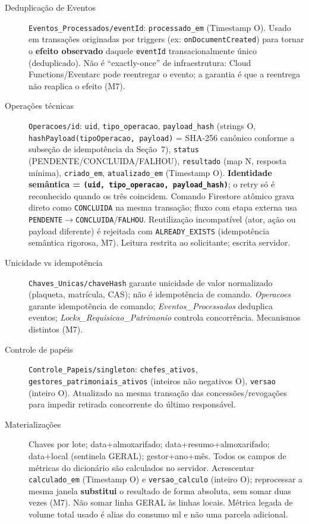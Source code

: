 \begin{description}
\item[Deduplicação de Eventos] \texttt{Eventos\_Processados/eventId}: \texttt{processado\_em} (Timestamp O). Usado em transações originadas por triggers (ex: \texttt{onDocumentCreated}) para tornar o \textbf{efeito observado} daquele \texttt{eventId} transacionalmente único (deduplicado). Não é ``exactly-once'' de infraestrutura: Cloud Functions/Eventarc pode reentregar o evento; a garantia é que a reentrega não reaplica o efeito (M7).
\item[Operações técnicas] \texttt{Operacoes/id}: \texttt{uid}, \texttt{tipo\_operacao}, \texttt{payload\_hash} (strings O, \texttt{hashPayload(tipoOperacao, payload)} = SHA-256 canônico conforme a subseção de idempotência da Seção~7), \texttt{status} (PENDENTE/CONCLUIDA/FALHOU), \texttt{resultado} (map N, resposta mínima), \texttt{criado\_em}, \texttt{atualizado\_em} (Timestamp O). \textbf{Identidade semântica = \texttt{(uid, tipo\_operacao, payload\_hash)}}; o retry só é reconhecido quando os três coincidem. Comando Firestore atômico grava direto como \texttt{CONCLUIDA} na mesma transação; fluxo com etapa externa usa \texttt{PENDENTE}$\rightarrow$\texttt{CONCLUIDA}/\texttt{FALHOU}. Reutilização incompatível (ator, ação ou payload diferente) é rejeitada com \texttt{ALREADY\_EXISTS} (idempotência semântica rigorosa, M7). Leitura restrita ao solicitante; escrita servidor.
\item[Unicidade vs idempotência] \texttt{Chaves\_Unicas/chaveHash} garante unicidade de valor normalizado (plaqueta, matrícula, CAS); não é idempotência de comando. \textit{Operacoes} garante idempotência de comando; \textit{Eventos\_Processados} deduplica eventos; \textit{Locks\_Requisicao\_Patrimonio} controla concorrência. Mecanismos distintos (M7).
\item[Controle de papéis] \texttt{Controle\_Papeis/singleton}: \texttt{chefes\_ativos}, \texttt{gestores\_patrimoniais\_ativos} (inteiros não negativos O), \texttt{versao} (inteiro O). Atualizado na mesma transação das concessões/revogações para impedir retirada concorrente do último responsável.
\item[Materializações] Chaves por lote; data+almoxarifado; data+resumo+almoxarifado; data+local (sentinela GERAL); gestor+ano+mês. Todos os campos de métricas do dicionário são calculados no servidor. Acrescentar \texttt{calculado\_em} (Timestamp O) e \texttt{versao\_calculo} (inteiro O); reprocessar a mesma janela \textbf{substitui} o resultado de forma absoluta, sem somar duas vezes (M7). Não somar linha GERAL às linhas locais. Métrica legada de volume total usado é alias do consumo ml e não uma parcela adicional.
\end{description}

